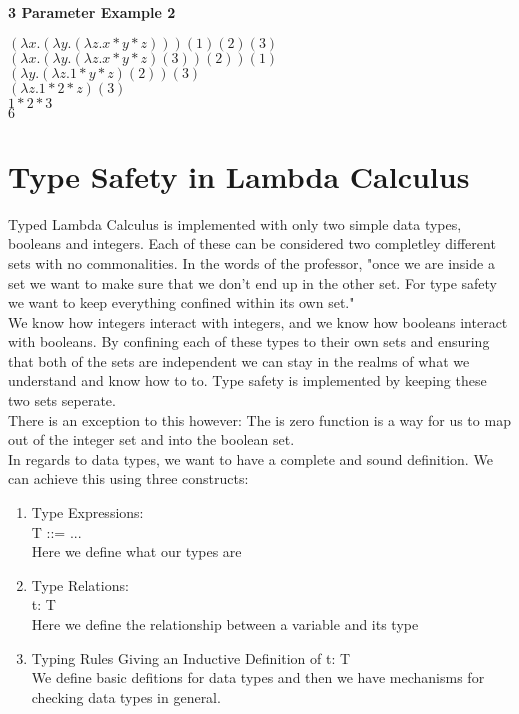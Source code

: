 \documentclass[11pt]{article}
\begin{document}
\noindent
\textbf{3 Parameter Example 2}

$(\lambda x.(\lambda y.(\lambda z.x * y * z)))(1)(2)(3)$\\
\indent
$(\lambda x.(\lambda y.(\lambda z.x * y * z)(3))(2))(1)$\\
\indent
$(\lambda y.(\lambda z.1 * y * z)(2))(3)$\\
\indent
$(\lambda z.1 * 2 * z)(3)$\\
\indent
$1 * 2 * 3$\\
\indent
$6$\\




\newpage
\section{Type Safety in Lambda Calculus}
Typed Lambda Calculus is implemented with only two simple data types, booleans
and integers.  Each of these can be considered two completley different sets
with no commonalities.  In the words of the professor, "once we are inside a
set we want to make sure that we don't end up in the other set. For type safety
we want to keep everything confined within its own set."\\

We know how integers interact with integers, and we know how booleans interact
with booleans.  By confining each of these types to their own sets and
ensuring that both of the sets are independent we can stay in the realms of
what we understand and know how to to.  Type safety is implemented by keeping
these two sets seperate.\\

There is an exception to this however: The is zero function is a way for us to
map out of the integer set and into the boolean set.\\

In regards to data types, we want to have a complete and sound definition.  We
can achieve this using three constructs:\\
\begin{enumerate}
    \item Type Expressions:\\
        T ::= ...\\
        Here we define what our types are

    \item Type Relations:\\
        t: T\\
        Here we define the relationship between a variable and its type

    \item Typing Rules Giving an Inductive Definition of t: T\\
        We define basic defitions for data types and then we have mechanisms
        for checking data types in general.
\end{enumerate}
\end{document}
